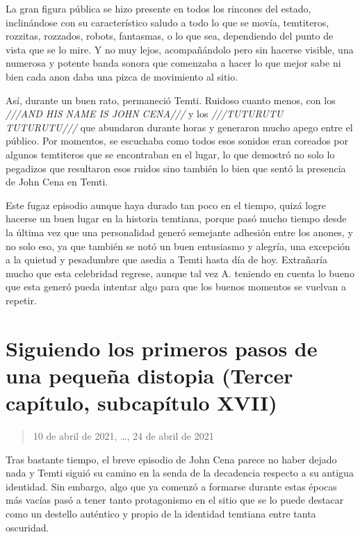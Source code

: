 \documentclass[
  spanish,
]{book}
\begin{document}
La gran figura pública se hizo presente en todos los rincones del estado, inclinándose con su característico saludo a todo lo que se movía, temtiteros, rozzitas, rozzados, robots, fantasmas, o lo que sea, dependiendo del punto de vista que se lo mire. Y no muy lejos, acompañándolo pero sin hacerse visible, una numerosa y potente banda sonora que comenzaba a hacer lo que mejor sabe ni bien cada anon daba una pizca de movimiento al sitio.

Así, durante un buen rato, permaneció Temti. Ruidoso cuanto menos, con los \emph{///AND HIS NAME IS JOHN CENA///} y los \emph{///TUTURUTU TUTURUTU///} que abundaron durante horas y generaron mucho apego entre el público. Por momentos, se escuchaba como todos esos sonidos eran coreados por algunos temtiteros que se encontraban en el lugar, lo que demostró no solo lo pegadizos que resultaron esos ruidos sino también lo bien que sentó la presencia de John Cena en Temti.

Este fugaz episodio aunque haya durado tan poco en el tiempo, quizá logre hacerse un buen lugar en la historia temtiana, porque pasó mucho tiempo desde la última vez que una personalidad generó semejante adhesión entre los anones, y no solo eso, ya que también se notó un buen entusiasmo y alegría, una excepción a la quietud y pesadumbre que asedia a Temti hasta día de hoy.
Extrañaría mucho que esta celebridad regrese, aunque tal vez A. teniendo en cuenta lo bueno que esta generó pueda intentar algo para que los buenos momentos se vuelvan a repetir.

\hypertarget{siguiendo-los-primeros-pasos-de-una-pequeuxf1a-distopia-tercer-capuxedtulo-subcapuxedtulo-xvii}{%
\section{Siguiendo los primeros pasos de una pequeña distopia (Tercer capítulo, subcapítulo XVII)}\label{siguiendo-los-primeros-pasos-de-una-pequeuxf1a-distopia-tercer-capuxedtulo-subcapuxedtulo-xvii}}

\begin{quote}
10 de abril de 2021, \ldots, 24 de abril de 2021
\end{quote}

Tras bastante tiempo, el breve episodio de John Cena parece no haber dejado nada y Temti siguió su camino en la senda de la decadencia respecto a su antigua identidad.
Sin embargo, algo que ya comenzó a formarse durante estas épocas más vacías pasó a tener tanto protagonismo en el sitio que se lo puede destacar como un destello auténtico y propio de la identidad temtiana entre tanta oscuridad.
\end{document}
